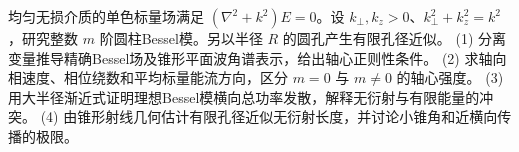 均匀无损介质的单色标量场满足 \((\nabla^2+k^2)E=0\)。设 \(k_\perp,k_z>0\)、\(k_\perp^2+k_z^2=k^2\)，研究整数 \(m\) 阶圆柱Bessel模。另以半径 \(R\) 的圆孔产生有限孔径近似。
(1) 分离变量推导精确Bessel场及锥形平面波角谱表示，给出轴心正则性条件。
(2) 求轴向相速度、相位绕数和平均标量能流方向，区分 \(m=0\) 与 \(m\ne0\) 的轴心强度。
(3) 用大半径渐近式证明理想Bessel模横向总功率发散，解释无衍射与有限能量的冲突。
(4) 由锥形射线几何估计有限孔径近似无衍射长度，并讨论小锥角和近横向传播的极限。
